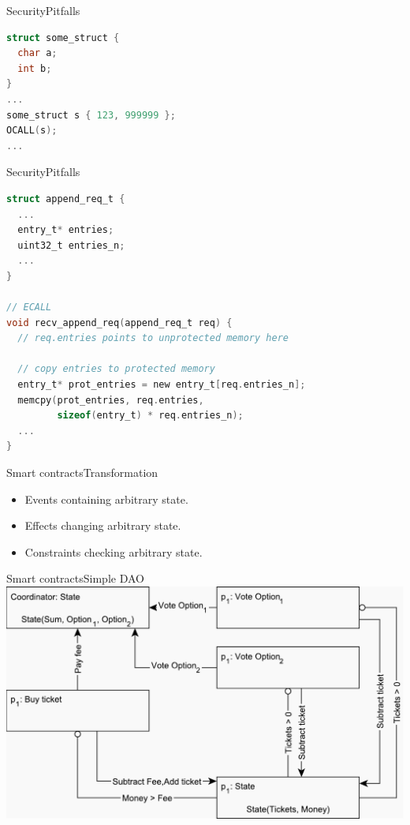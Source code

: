 \documentclass{beamer}
\begin{document}
\begin{frame}[fragile]{Security}{Pitfalls}%
  \vfill
  \begin{lstlisting}[language=C, basicstyle=\footnotesize\ttfamily, keywordstyle=\color{mLightBrown}]
struct some_struct {
  char a;
  int b;
}
...
some_struct s { 123, 999999 };
OCALL(s);
...
  \end{lstlisting}
  \vfill
\end{frame}

\begin{frame}[fragile]{Security}{Pitfalls}%
  \vfill
  \begin{lstlisting}[language=C, basicstyle=\footnotesize\ttfamily, keywordstyle=\color{mLightBrown}, commentstyle=\color{gray}]
struct append_req_t {
  ...
  entry_t* entries;
  uint32_t entries_n;
  ...
}

// ECALL
void recv_append_req(append_req_t req) {
  // req.entries points to unprotected memory here

  // copy entries to protected memory
  entry_t* prot_entries = new entry_t[req.entries_n];
  memcpy(prot_entries, req.entries,
         sizeof(entry_t) * req.entries_n);
  ...
}
  \end{lstlisting}
  \vfill
\end{frame}

\begin{frame}{Smart contracts}{Transformation}%
    \begin{itemize}
    	\item Events containing arbitrary state.
    	\item Effects changing arbitrary state.
    	\item Constraints checking arbitrary state.
    \end{itemize}
\end{frame}

\begin{frame}{Smart contracts}{Simple DAO}
	\centering
	\includegraphics[scale=0.5]{figures/dao-simple.pdf}
\end{frame}
\end{document}
